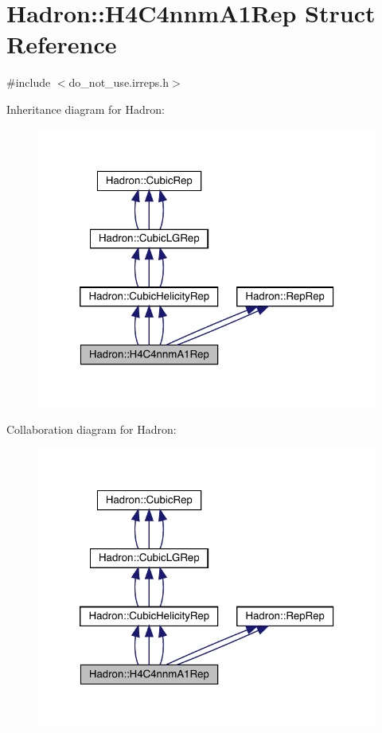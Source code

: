 \hypertarget{structHadron_1_1H4C4nnmA1Rep}{}\section{Hadron\+:\+:H4\+C4nnm\+A1\+Rep Struct Reference}
\label{structHadron_1_1H4C4nnmA1Rep}


{\ttfamily \#include $<$do\+\_\+not\+\_\+use.\+irreps.\+h$>$}



Inheritance diagram for Hadron\+:
\nopagebreak
\begin{figure}[H]
\begin{center}
\leavevmode
\includegraphics[width=320pt]{d5/d80/structHadron_1_1H4C4nnmA1Rep__inherit__graph}
\end{center}
\end{figure}


Collaboration diagram for Hadron\+:
\nopagebreak
\begin{figure}[H]
\begin{center}
\leavevmode
\includegraphics[width=320pt]{d9/dac/structHadron_1_1H4C4nnmA1Rep__coll__graph}
\end{center}
\end{figure}
